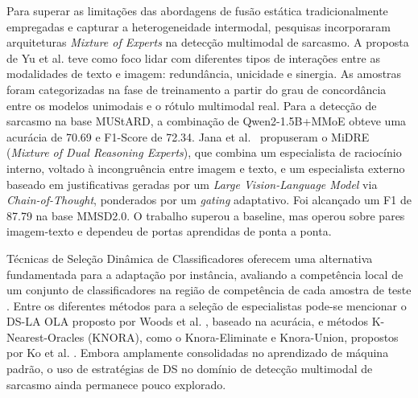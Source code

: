 \documentclass[conference]{IEEEtran}
\begin{document}
Para superar as limitações das abordagens de fusão estática tradicionalmente empregadas e capturar a heterogeneidade intermodal, pesquisas incorporaram arquiteturas \textit{Mixture of Experts} na detecção multimodal de sarcasmo. A proposta de Yu et al. \cite{yu2024mmoe} teve como foco lidar com diferentes tipos de interações entre as modalidades de texto e imagem: redundância, unicidade e sinergia. As amostras foram categorizadas na fase de treinamento a partir do grau de concordância entre os modelos unimodais e o rótulo multimodal real. Para a detecção de sarcasmo na base MUStARD, a combinação de Qwen2-1.5B+MMoE obteve uma acurácia de 70.69 e F1-Score de 72.34. Jana et al.~\cite{jana2025midre} propuseram o MiDRE (\textit{Mixture of Dual Reasoning Experts}), que combina um especialista de raciocínio interno, voltado à incongruência entre imagem e texto, e um especialista externo baseado em justificativas geradas por um \textit{Large Vision-Language Model} via \textit{Chain-of-Thought}, ponderados por um \textit{gating} adaptativo. Foi alcançado um F1 de 87.79 na base MMSD2.0. O trabalho superou a baseline, mas operou sobre pares imagem-texto e dependeu de portas aprendidas de ponta a ponta.

Técnicas de Seleção Dinâmica de Classificadores oferecem uma alternativa fundamentada para a adaptação por instância, avaliando a competência local de um conjunto de classificadores na região de competência de cada amostra de teste \cite{britto2014dynamic,cruz2018dynamic}. Entre os diferentes métodos para a seleção de especialistas pode-se mencionar o DS-LA OLA proposto por Woods et al. \cite{woods1997combination}, baseado na acurácia, e métodos K-Nearest-Oracles (KNORA), como o Knora-Eliminate e Knora-Union, propostos por Ko et al. \cite{ko2008dynamic}. Embora amplamente consolidadas no aprendizado de máquina padrão, o uso de estratégias de DS no domínio de detecção multimodal de sarcasmo ainda permanece pouco explorado. 


\end{document}
